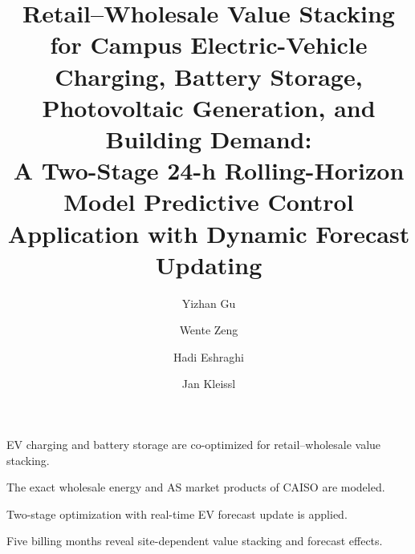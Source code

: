 \documentclass[final,5p,times]{elsarticle}
\begin{document}
\begin{frontmatter}

\title{Retail--Wholesale Value Stacking for Campus Electric-Vehicle Charging, Battery Storage, Photovoltaic Generation, and Building Demand: \\
A Two-Stage 24-h Rolling-Horizon Model Predictive Control Application with Dynamic Forecast Updating}

\author[ucsd]{Yizhan Gu}
\author[totalenergies]{Wente Zeng}
\author[totalenergies]{Hadi Eshraghi}
\author[ucsd]{Jan Kleissl}


\begin{highlights}
\item EV charging and battery storage are co-optimized for retail--wholesale value stacking.
\item The exact wholesale energy and AS market products of CAISO are modeled.
\item Two-stage optimization with real-time  EV forecast update is applied.
\item Five billing months reveal site-dependent value stacking and forecast effects.
\end{highlights}


\end{frontmatter}
\end{document}
